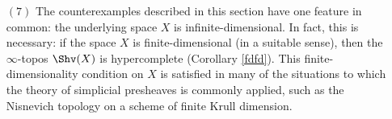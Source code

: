 \begin{itemize}
\item[$(7)$] The counterexamples described in this section have one feature in common: the underlying space $X$ is infinite-dimensional. In fact, this is necessary: if the space $X$ is finite-dimensional (in a suitable sense), then the $\infty$-topos $\Shv(X)$ is hypercomplete (Corollary \ref{fdfd}). This finite-dimensionality condition on $X$ is satisfied in many of the situations to which the theory of simplicial presheaves is commonly applied, such as the Nisnevich
topology on a scheme of finite Krull dimension.

\end{itemize}
